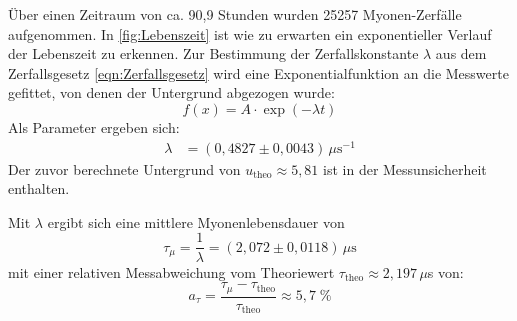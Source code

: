         \FloatBarrier

        Über einen Zeitraum von ca. 90,9 Stunden wurden 25257 Myonen-Zerfälle aufgenommen. In \autoref{fig:Lebenszeit} ist wie zu erwarten ein exponentieller Verlauf der Lebenszeit zu erkennen. Zur Bestimmung der Zerfallskonstante $\lambda$ aus dem Zerfallsgesetz \eqref{eqn:Zerfallsgesetz} wird eine Exponentialfunktion an die Messwerte gefittet, von denen der Untergrund abgezogen wurde:
        \begin{equation*}
            f(x) = A \cdot \exp\left(-\lambda t\right)
        \end{equation*}
        Als Parameter ergeben sich:
        \begin{align*}
            \lambda &= (0,4827 \pm 0,0043) \, \mu\text{s}^{-1}
        \end{align*}
        Der zuvor berechnete Untergrund von $u_{\text{theo}} \approx 5,81$ ist in der Messunsicherheit enthalten.

        Mit $\lambda$ ergibt sich eine mittlere Myonenlebensdauer von
        \begin{equation*}
            \tau_{\mu} = \frac{1}{\lambda} = (2,072 \pm 0,0118) \, \mu\text{s}
        \end{equation*}
        mit einer relativen Messabweichung vom Theoriewert $\tau_{\text{theo}} \approx 2,197 \, \mu$s \cite{zyla_review_2020} von:
        \begin{equation*}
            a_{\tau} = \frac{\tau_{\mu} - \tau_{\text{theo}}}{\tau_{\text{theo}}} \approx 5,7 \;\%    
        \end{equation*}



















































